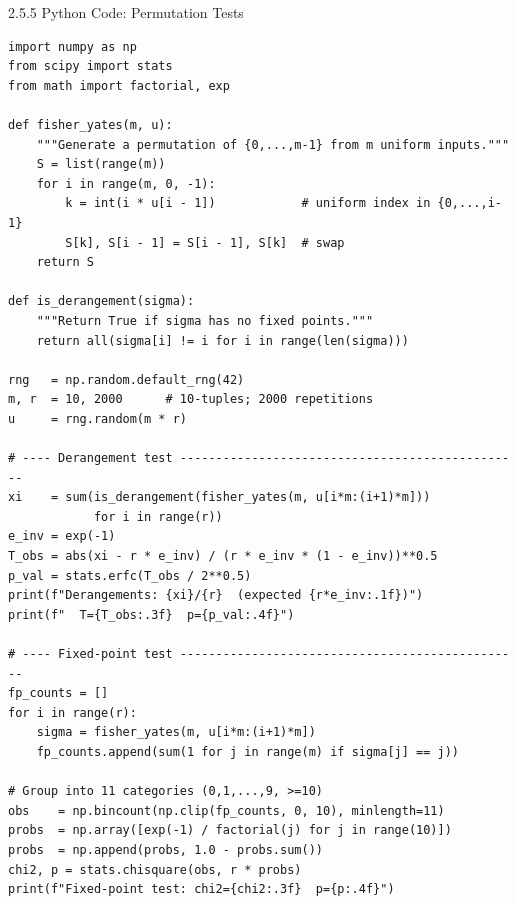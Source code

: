 \documentclass[aspectratio=169,10pt]{beamer}
\begin{document}
\begin{frame}[fragile]{2.5.5 Python Code: Permutation Tests}

\begin{lstlisting}[style=python]
import numpy as np
from scipy import stats
from math import factorial, exp

def fisher_yates(m, u):
    """Generate a permutation of {0,...,m-1} from m uniform inputs."""
    S = list(range(m))
    for i in range(m, 0, -1):
        k = int(i * u[i - 1])            # uniform index in {0,...,i-1}
        S[k], S[i - 1] = S[i - 1], S[k]  # swap
    return S

def is_derangement(sigma):
    """Return True if sigma has no fixed points."""
    return all(sigma[i] != i for i in range(len(sigma)))

rng   = np.random.default_rng(42)
m, r  = 10, 2000      # 10-tuples; 2000 repetitions
u     = rng.random(m * r)

# ---- Derangement test ------------------------------------------------
xi    = sum(is_derangement(fisher_yates(m, u[i*m:(i+1)*m]))
            for i in range(r))
e_inv = exp(-1)
T_obs = abs(xi - r * e_inv) / (r * e_inv * (1 - e_inv))**0.5
p_val = stats.erfc(T_obs / 2**0.5)
print(f"Derangements: {xi}/{r}  (expected {r*e_inv:.1f})")
print(f"  T={T_obs:.3f}  p={p_val:.4f}")

# ---- Fixed-point test ------------------------------------------------
fp_counts = []
for i in range(r):
    sigma = fisher_yates(m, u[i*m:(i+1)*m])
    fp_counts.append(sum(1 for j in range(m) if sigma[j] == j))

# Group into 11 categories (0,1,...,9, >=10)
obs    = np.bincount(np.clip(fp_counts, 0, 10), minlength=11)
probs  = np.array([exp(-1) / factorial(j) for j in range(10)])
probs  = np.append(probs, 1.0 - probs.sum())
chi2, p = stats.chisquare(obs, r * probs)
print(f"Fixed-point test: chi2={chi2:.3f}  p={p:.4f}")
\end{lstlisting}

\end{frame}
\end{document}
